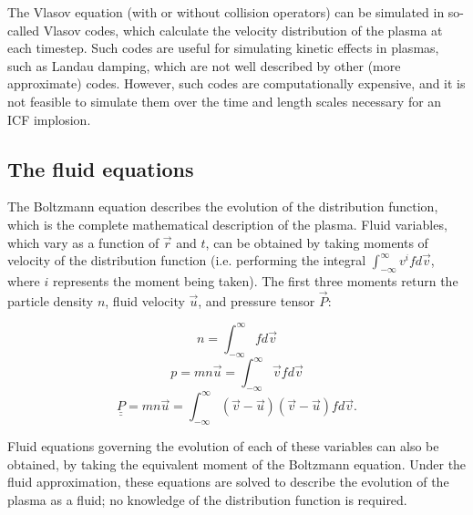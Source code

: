 The Vlasov equation (with or without collision operators) can be simulated in so-called Vlasov codes, which calculate the velocity distribution of the plasma at each timestep. Such codes are useful for simulating kinetic effects in plasmas, such as Landau damping, which are not well described by other (more approximate) codes. However, such codes are computationally expensive, and it is not feasible to simulate them over the time and length scales necessary for an ICF implosion.

\subsection{The fluid equations}


The Boltzmann equation describes the evolution of the distribution function, which is the complete mathematical description of the plasma. Fluid variables, which vary as a function of $\vec{r}$ and $t$, can be obtained by taking moments of velocity of the distribution function (i.e. performing the integral $ \int^{\infty}_{-\infty} v^i f d\vec{v} $, where $i$ represents the moment being taken). The first three moments return the particle density $n$, fluid velocity $\vec{u}$, and pressure tensor $\vec{P}$:

\begin{equation} n = \int^{\infty}_{-\infty} f d\vec{v}  \end{equation}
\begin{equation} p = mn\vec{u} = \int^{\infty}_{-\infty} \vec{v} f d\vec{v} \end{equation}
\begin{equation} \underline{\underline{P}} = mn\vec{u} = \int^{\infty}_{-\infty} (\vec{v} - \vec{u})(\vec{v} - \vec{u}) f d\vec{v}.  \end{equation}

Fluid equations governing the evolution of each of these variables can also be obtained, by taking the equivalent moment of the Boltzmann equation. Under the fluid approximation, these equations are solved to describe the evolution of the plasma as a fluid; no knowledge of the distribution function is required.

